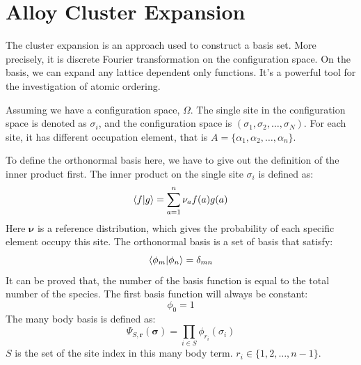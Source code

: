 \documentclass[../main.tex]{subfiles}
\begin{document}
\section{\textbf{Alloy Cluster Expansion}}

The cluster expansion is an approach used to construct a basis set. More precisely, it is discrete Fourier transformation on the configuration space.
On the basis, we can expand any lattice dependent only functions. It's a powerful tool for the investigation of atomic ordering.

Assuming we have a configuration space, $\Omega$. The single site in the configuration space is denoted as 
$\sigma_i$, and the configuration space is $(\sigma_1, \sigma_2, \dots, \sigma_N)$. For each site, it has different occupation
element, that is $A = \{\alpha_1, \alpha_2, \dots, \alpha_n\}$.

To define the orthonormal basis here, we have to give out the definition of the inner product first. The inner product
on the single site $\sigma_i$ is defined as:
\begin{equation}
    \braket{f}{g} =\sum_{a=1}^{n} \nu_a f(a)g(a)
\end{equation}
Here $\bm{\nu}$ is a reference distribution, which gives the probability of each specific element occupy this site.
The orthonormal basis is a set of basis that satisfy:
\begin{equation}
    \braket{\phi_m}{\phi_n} = \delta_{mn}
\end{equation}
It can be proved that, the number of the basis function is equal to the total number of the species.
The first basis function will always be constant:
\begin{equation}
    \phi_0 = 1
\end{equation}
The many body basis is defined as:
\begin{equation}
    \Psi_{S,\bm{r}}(\bm{\sigma}) = \prod_{i \in S}\phi_{r_i}(\sigma_i) 
\end{equation}
$S$ is the set of the site index in this many body term. $r_i \in \{1, 2, \dots, n-1\}$.
\end{document}
